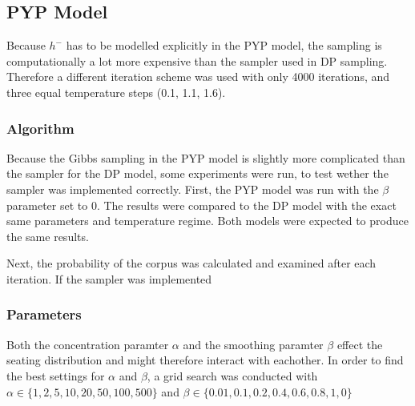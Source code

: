 \subsection{PYP Model}

Because $h^{-}$ has to be modelled explicitly in the PYP model, the sampling is computationally a lot more expensive than the sampler used in DP sampling. Therefore a different iteration scheme was used with only 4000 iterations, and three equal temperature steps (0.1, 1.1, 1.6).

\subsubsection{Algorithm}
Because the Gibbs sampling in the PYP model is slightly more complicated than the sampler for the DP model, some experiments were run, to test wether the sampler was implemented correctly.
First, the PYP model was run with the $\beta$ parameter set to 0. The results were compared to the DP model with the exact same parameters and temperature regime. Both models were expected to produce the same results.

Next, the probability of the corpus was calculated and examined after each iteration. If the sampler was implemented

\subsubsection{Parameters}
Both the concentration paramter $\alpha$ and the smoothing paramter $\beta$ effect the seating distribution and might therefore interact with eachother. In order to find the best settings for $\alpha$ and $\beta$, a grid search was conducted with $\alpha \in \{1, 2, 5, 10, 20, 50, 100, 500 \}$ and $\beta \in \{ 0.01, 0.1, 0.2, 0.4,0.6, 0.8, 1, 0 \}$
